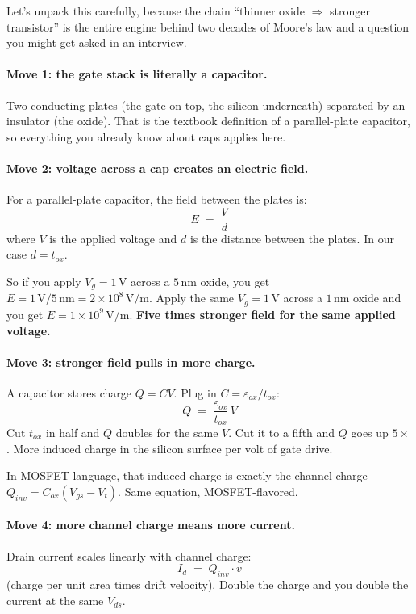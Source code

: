 \documentclass[11pt]{article}
\begin{document}
Let's unpack this carefully, because the chain ``thinner oxide $\Rightarrow$ stronger transistor'' is the entire engine behind two decades of Moore's law and a question you might get asked in an interview.

\paragraph{Move 1: the gate stack is literally a capacitor.} Two conducting plates (the gate on top, the silicon underneath) separated by an insulator (the oxide). That is the textbook definition of a parallel-plate capacitor, so everything you already know about caps applies here.

\paragraph{Move 2: voltage across a cap creates an electric field.} For a parallel-plate capacitor, the field between the plates is:
\begin{equation}
E \;=\; \frac{V}{d}
\end{equation}
where $V$ is the applied voltage and $d$ is the distance between the plates. In our case $d = t_{ox}$.

So if you apply $V_g = 1\,\text{V}$ across a $5\,\text{nm}$ oxide, you get $E = 1\,\text{V}/5\,\text{nm} = 2\times 10^8\,\text{V/m}$. Apply the same $V_g = 1\,\text{V}$ across a $1\,\text{nm}$ oxide and you get $E = 1\times 10^9\,\text{V/m}$. \textbf{Five times stronger field for the same applied voltage.}

\paragraph{Move 3: stronger field pulls in more charge.} A capacitor stores charge $Q = CV$. Plug in $C = \varepsilon_{ox}/t_{ox}$:
\begin{equation}
Q \;=\; \frac{\varepsilon_{ox}}{t_{ox}}\,V
\end{equation}
Cut $t_{ox}$ in half and $Q$ doubles for the same $V$. Cut it to a fifth and $Q$ goes up $5\times$. More induced charge in the silicon surface per volt of gate drive.

In MOSFET language, that induced charge is exactly the channel charge $Q_{inv} = C_{ox}(V_{gs} - V_t)$. Same equation, MOSFET-flavored.

\paragraph{Move 4: more channel charge means more current.} Drain current scales linearly with channel charge:
\begin{equation}
I_d \;=\; Q_{inv} \cdot v
\end{equation}
(charge per unit area times drift velocity). Double the charge and you double the current at the same $V_{ds}$.
\end{document}
